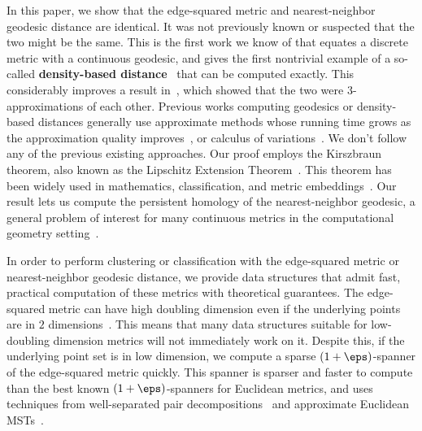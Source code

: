 
In this paper, we show that the edge-squared metric and nearest-neighbor
geodesic distance are
identical. It was not previously known or
suspected that the two might be the same. This is the
first work we know of that equates a discrete metric with a
continuous geodesic, and gives the first nontrivial example of a
so-called \textbf{density-based distance}~\cite{sajama05estimatingDBDM} that can
be computed exactly. This considerably improves a result
in~\cite{cohen15approximating}, which showed that the two were
$3$-approximations of each other. Previous works computing
geodesics or density-based distances generally use approximate
methods whose running time grows as the approximation
quality improves~\cite{Kimmel98, tenenbaum00global,
alamgir12shortest, agarwal16efficient, hwang2016,
cohen15approximating}, or
calculus of variations~\cite{bernoulli, Schwarzschild, Sussmann97}.
We don't follow any of the previous existing approaches. Our proof employs
the Kirszbraun theorem, also known as the Lipschitz
Extension Theorem~\cite{Kirszbraun1934, brehm1981}. This theorem has been
widely used in mathematics, classification, and metric
embeddings~\cite{Naor06, Lee05, Naor15, Gottlieb14, Gottlieb17}.
Our result lets us compute the persistent
homology of the nearest-neighbor geodesic, a general problem of interest for
many continuous metrics in the computational geometry
setting~\cite{edelsbrunner02topological,gasparovic17complete,chazal08towards,chazal13persistence,carlsson09topology}.

In order to perform clustering or classification with the edge-squared
metric or nearest-neighbor geodesic distance, we
provide data structures that admit fast, practical
computation of these metrics with theoretical guarantees. The
edge-squared metric can have high doubling
dimension even if the underlying points are in $2$
dimensions~\cite{cohen15approximating}. This
means that many data structures suitable for low-doubling dimension
metrics will not immediately
work on it. Despite this, if the underlying point set is in low dimension,
we compute a sparse $(1+\eps)$-spanner of
the edge-squared metric quickly.
This spanner is sparser and faster to compute than the
best known $(1+\eps)$-spanners for Euclidean metrics, and uses
techniques from well-separated pair
decompositions~\cite{Callahan1993} and
approximate Euclidean MSTs~\cite{arya95euclid, Arya2016,
Callahan1995}.

